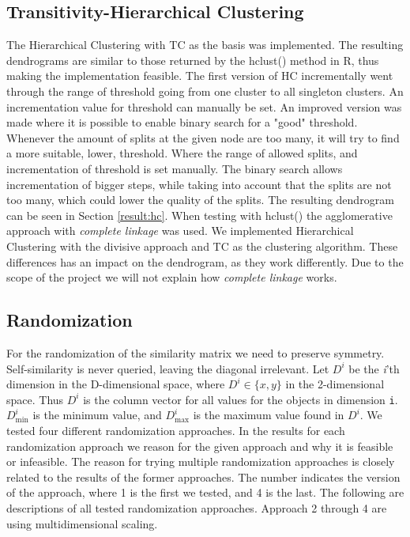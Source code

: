 \documentclass[a4paper,10pt]{article}
\theoremstyle{plain}
\theoremstyle{definition}
\begin{document}
\subsection{Transitivity-Hierarchical Clustering}
The Hierarchical Clustering with TC as the basis was implemented. The resulting dendrograms are similar to those returned by the hclust() method in R, thus making the implementation feasible. The first version of HC incrementally went through the range of threshold going from one cluster to all singleton clusters. An incrementation value for threshold can manually be set. An improved version was made where it is possible to enable binary search for a "good" threshold. Whenever the amount of splits at the given node are too many, it will try to find a more suitable, lower, threshold. Where the range of allowed splits, and incrementation of threshold is set manually. The binary search allows incrementation of bigger steps, while taking into account that the splits are not too many, which could lower the quality of the splits. The resulting dendrogram can be seen in Section \ref{result:hc}.  When testing with hclust() the agglomerative approach with \textit{complete linkage} was used. We implemented Hierarchical Clustering with the divisive approach and TC as the clustering algorithm. These differences has an impact on the dendrogram, as they work differently. Due to the scope of the project we will not explain how \textit{complete linkage} works.

\subsection{Randomization}
\label{sec:randomization}
For the randomization of the similarity matrix we need to preserve symmetry. Self-similarity is never queried, leaving the diagonal irrelevant. Let $D^i$ be the \textit{i}'th dimension in the D-dimensional space, where $D^i \in \{ x, y \}$ in the 2-dimensional space. Thus $D^i$ is the column vector for all values for the objects in dimension \texttt{i}. $D_{\min}^{i}$ is the minimum value, and $D_{\max}^{i}$ is the maximum value found in $D^i$.
We tested four different randomization approaches. In the results for each randomization approach we reason for the given approach and why it is feasible or infeasible. The reason for trying multiple randomization approaches is closely related to the results of the former approaches. The number indicates the version of the approach, where 1 is the first we tested, and 4 is the last.
The following are descriptions of all tested randomization approaches. Approach 2 through 4 are using multidimensional scaling.\\
\end{document}
